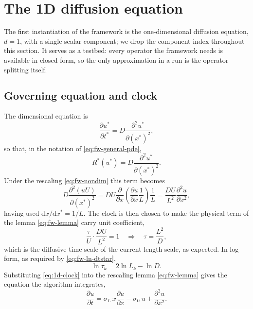 \section{The 1D diffusion equation}\label{sec:1d}

The first instantiation of the framework is the one-dimensional diffusion
equation, $d = 1$, with a single scalar component; we drop the component index
throughout this section. It serves as a testbed: every operator the framework
needs is available in closed form, so the only approximation in a run is the
operator splitting itself.

\subsection{Governing equation and clock}\label{ssec:1d-clock}

The dimensional equation is
\begin{equation}\label{eq:1d-dimensional}
  \frac{\partial u^*}{\partial t^*} = D \frac{\partial^2 u^*}{\partial (x^*)^2},
\end{equation}
so that, in the notation of \eqref{eq:fw-general-pde},
\begin{equation}\label{eq:1d-R}
  R^*(u^*) = D \frac{\partial^2 u^*}{\partial (x^*)^2}.
\end{equation}
Under the rescaling \eqref{eq:fw-nondim} this term becomes
\begin{equation}\label{eq:1d-R-rescaled}
  D \frac{\partial^2 (u U)}{\partial (x^*)^2}
  = D U \frac{\partial}{\partial x}\!\left( \frac{\partial u}{\partial x} \frac{1}{L} \right) \frac{1}{L}
  = \frac{D U}{L^2} \frac{\partial^2 u}{\partial x^2},
\end{equation}
having used $\mathrm{d}x/\mathrm{d}x^* = 1/L$. The clock is then chosen to make
the physical term of the lemma \eqref{eq:fw-lemma} carry unit coefficient,
\begin{equation}\label{eq:1d-clock}
  \frac{\tau}{U} \cdot \frac{D U}{L^2} = 1
  \quad\Longrightarrow\quad
  \tau = \frac{L^2}{D},
\end{equation}
which is the diffusive time scale of the current length scale, as expected.
In log form, as required by \eqref{eq:fw-ln-dtstar},
\begin{equation}\label{eq:1d-ln-clock}
  \ln \tau_k = 2 \ln L_k - \ln D .
\end{equation}
Substituting \eqref{eq:1d-clock} into the rescaling lemma
\eqref{eq:fw-lemma} gives the equation the algorithm integrates,
\begin{equation}\label{eq:1d-transformed}
  \frac{\partial u}{\partial t}
  = \sigma_L\, x \frac{\partial u}{\partial x}
  - \sigma_U\, u
  + \frac{\partial^2 u}{\partial x^2}.
\end{equation}

